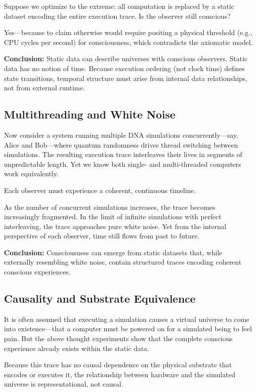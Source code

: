 \documentclass[11pt]{article}
\begin{document}
Suppose we optimize to the extreme: all computation is replaced by a static dataset encoding the entire execution trace. Is the observer still conscious?

Yes—because to claim otherwise would require positing a physical threshold (e.g., CPU cycles per second) for consciousness, which contradicts the axiomatic model.

\textbf{Conclusion:} Static data can describe universes with conscious observers. Static data has no notion of time. Because execution ordering (not clock time) defines state transitions, temporal structure must arise from internal data relationships, not from external runtime.

\subsection{Multithreading and White Noise}

Now consider a system running multiple DNA simulations concurrently—say, Alice and Bob—where quantum randomness drives thread switching between simulations. The resulting execution trace interleaves their lives in segments of unpredictable length. Yet we know both single- and multi-threaded computers work equivalently.

Each observer must experience a coherent, continuous timeline.

As the number of concurrent simulations increases, the trace becomes increasingly fragmented. In the limit of infinite simulations with perfect interleaving, the trace approaches pure white noise. Yet from the internal perspective of each observer, time still flows from past to future.

\textbf{Conclusion:} Consciousness can emerge from static datasets that, while externally resembling white noise, contain structured traces encoding coherent conscious experiences.

\subsection{Causality and Substrate Equivalence}

It is often assumed that executing a simulation causes a virtual universe to come into existence—that a computer must be powered on for a simulated being to feel pain. But the above thought experiments show that the complete conscious experience already exists within the static data.

Because this trace has no causal dependence on the physical substrate that encodes or executes it, the relationship between hardware and the simulated universe is representational, not causal.
\end{document}
